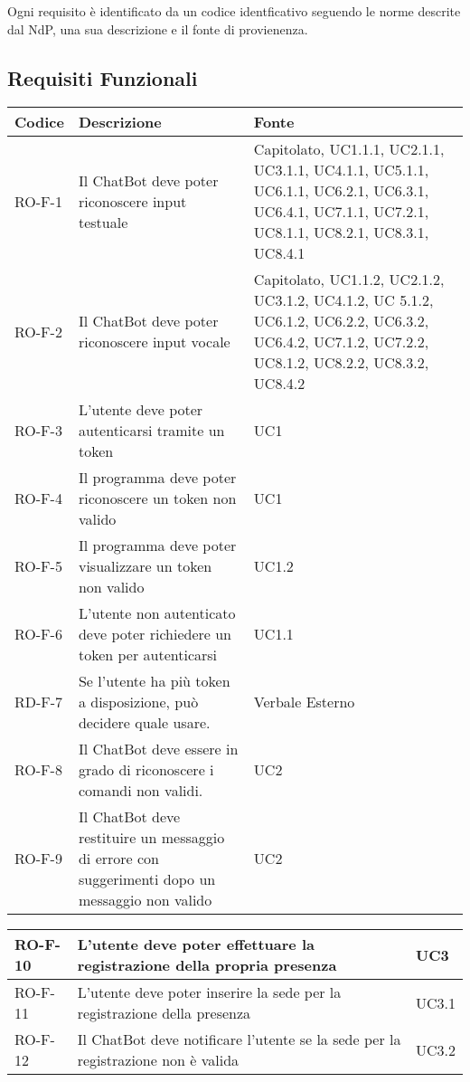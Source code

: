 Ogni requisito è identificato da un codice identficativo seguendo le norme descrite dal NdP, una sua descrizione e il fonte di provienenza.
\subsection{Requisiti Funzionali}
\begin{center}
\renewcommand{\arraystretch}{1.8} %
\begin{tabular}{ | m{8em} | m{18em} | m{12em} | }
\hline
Codice&Descrizione&Fonte\\
\hline
RO-F-1 & Il ChatBot deve poter riconoscere input testuale & Capitolato, UC1.1.1, UC2.1.1, UC3.1.1, UC4.1.1, UC5.1.1, UC6.1.1, UC6.2.1, UC6.3.1, UC6.4.1, UC7.1.1, UC7.2.1, UC8.1.1, UC8.2.1,  UC8.3.1, UC8.4.1\\
\hline
RO-F-2&Il ChatBot deve poter riconoscere input vocale&Capitolato, UC1.1.2, UC2.1.2, UC3.1.2, UC4.1.2, UC 5.1.2, UC6.1.2, UC6.2.2, UC6.3.2, UC6.4.2, UC7.1.2, UC7.2.2, UC8.1.2, UC8.2.2,  UC8.3.2, UC8.4.2\\
\hline
RO-F-3&L’utente deve poter autenticarsi tramite un token&UC1\\
\hline
RO-F-4&Il programma deve poter riconoscere un token non valido&UC1\\
\hline
RO-F-5&Il programma deve poter visualizzare un token non valido&UC1.2\\
\hline
RO-F-6&L’utente non autenticato deve poter richiedere un token per autenticarsi&UC1.1\\
\hline
RD-F-7&Se l’utente ha più token a disposizione, può decidere quale usare.&Verbale Esterno\\
\hline
RO-F-8&Il ChatBot deve essere in grado di riconoscere i comandi non validi.&UC2\\
\hline
RO-F-9&Il ChatBot deve restituire un messaggio di errore con suggerimenti dopo un messaggio non valido &UC2 \\
\hline
\end{tabular}
\newpage
\begin{tabular}{ | m{8em} | m{18em} | m{12em} | }
\hline
RO-F-10&L’utente deve poter effettuare la registrazione della propria presenza &UC3 \\
\hline
RO-F-11&L’utente deve poter inserire la sede per la registrazione della presenza &UC3.1 \\
\hline
RO-F-12&Il ChatBot deve notificare l’utente se la sede per la registrazione non è valida &UC3.2 \\

\end{tabular}
\end{center}
